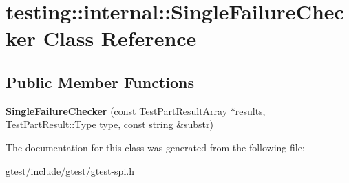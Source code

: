 \hypertarget{classtesting_1_1internal_1_1SingleFailureChecker}{}\section{testing\+:\+:internal\+:\+:Single\+Failure\+Checker Class Reference}
\label{classtesting_1_1internal_1_1SingleFailureChecker}
\subsection*{Public Member Functions}
\begin{DoxyCompactItemize}
\item 
\mbox{\label{classtesting_1_1internal_1_1SingleFailureChecker_a6d350d385526c97c9982e928f5f8fb56}} 
{\bfseries Single\+Failure\+Checker} (const \hyperlink{classtesting_1_1TestPartResultArray}{Test\+Part\+Result\+Array} $\ast$results, Test\+Part\+Result\+::\+Type type, const string \&substr)
\end{DoxyCompactItemize}


The documentation for this class was generated from the following file\+:\begin{DoxyCompactItemize}
\item 
gtest/include/gtest/gtest-\/spi.\+h\end{DoxyCompactItemize}
